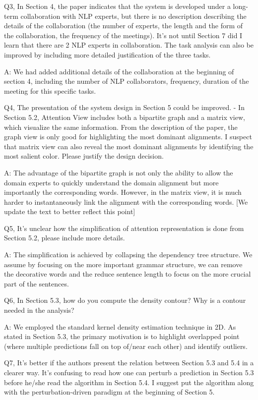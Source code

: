Q3, In Section 4, the paper indicates that the system is developed under a long-term collaboration with NLP experts, but there is no description describing the details of the collaboration (the number of experts, the length and the form of the collaboration, the frequency of the meetings). It's not until Section 7 did I learn that there are 2 NLP experts in collaboration. The task analysis can also be improved by including more detailed justification of the three tasks.

A: We had added additional details of the collaboration at the beginning of section 4, including the number of NLP collaborators, frequency, duration of the meeting for this specific tasks.

Q4, The presentation of the system design in Section 5 could be improved.
- In Section 5.2, Attention View includes both a bipartite graph and a matrix view, which visualize the same information. From the description of the paper, the graph view is only good for highlighting the most dominant alignments. I suspect that matrix view can also reveal the most dominant alignments by identifying the most salient color. Please justify the design decision.

A: The advantage of the bipartite graph is not only the ability to allow the domain experts to quickly understand the domain alignment but more importantly the corresponding words. However, in the matrix view, it is much harder to instantaneously link the alignment with the corresponding words. [We update the text to better reflect this point]

Q5, It's unclear how the simplification of attention representation is done from Section 5.2, please include more details.

A: The simplification is achieved by collapsing the dependency tree structure. We assume by focusing on the more important grammar structure, we can remove the decorative words and the reduce sentence length to focus on the more crucial part of the sentences.

Q6, In Section 5.3, how do you compute the density contour? Why is a contour needed in the analysis?

A: We employed the standard kernel density estimation technique in 2D. As stated in Section 5.3, the primary motivation is to highlight overlapped point (where multiple predictions fall on top of/near each other) and identify outliers.

Q7, It's better if the authors present the relation between Section 5.3 and 5.4 in a clearer way. It's confusing to read how one can perturb a prediction in Section 5.3 before he/she read the algorithm in Section 5.4. I suggest put the algorithm along with the perturbation-driven paradigm at the beginning of Section 5.

